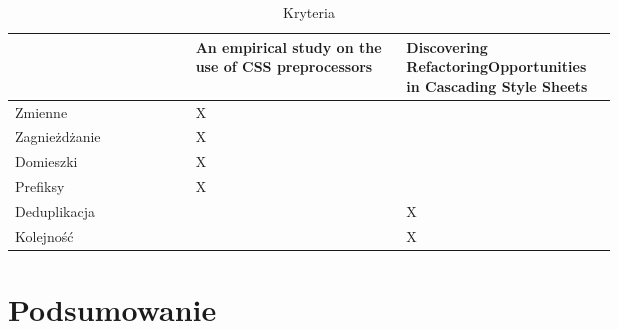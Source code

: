 \documentclass[a4paper,12pt]{book} %
\begin{document}
\begin{table}[h!]
  \begin{tabular}{ l | P{0.35\linewidth} | P{0.35\linewidth}}
     & An empirical study on the use of CSS preprocessors \cite{Mazinanian__Tsantalis__2016} & Discovering RefactoringOpportunities in Cascading Style Sheets \cite{Mazinanian__Tsantalis__2}\\ 
     \hline
     Zmienne &X&\\
     
      Zagnieżdżanie&X&  \\
     
      Domieszki  &X&\\
     
      Prefiksy   &X&\\
     
     Deduplikacja  &&X\\
     
     Kolejność  &&X 
     
  \end{tabular}
  \caption{Kryteria}
\end{table}

\chapter*{Podsumowanie}





\end{document}

